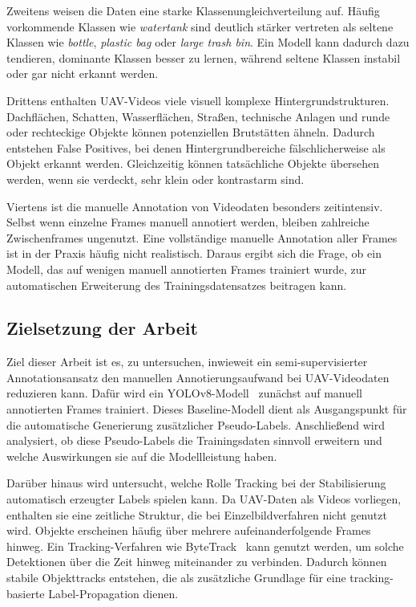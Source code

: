Zweitens weisen die Daten eine starke Klassenungleichverteilung auf. Häufig vorkommende Klassen wie \textit{watertank} sind deutlich stärker vertreten als seltene Klassen wie \textit{bottle}, \textit{plastic bag} oder \textit{large trash bin}. Ein Modell kann dadurch dazu tendieren, dominante Klassen besser zu lernen, während seltene Klassen instabil oder gar nicht erkannt werden.

Drittens enthalten UAV-Videos viele visuell komplexe Hintergrundstrukturen. Dachflächen, Schatten, Wasserflächen, Straßen, technische Anlagen und runde oder rechteckige Objekte können potenziellen Brutstätten ähneln. Dadurch entstehen False Positives, bei denen Hintergrundbereiche fälschlicherweise als Objekt erkannt werden. Gleichzeitig können tatsächliche Objekte übersehen werden, wenn sie verdeckt, sehr klein oder kontrastarm sind.

Viertens ist die manuelle Annotation von Videodaten besonders zeitintensiv. Selbst wenn einzelne Frames manuell annotiert werden, bleiben zahlreiche Zwischenframes ungenutzt. Eine vollständige manuelle Annotation aller Frames ist in der Praxis häufig nicht realistisch. Daraus ergibt sich die Frage, ob ein Modell, das auf wenigen manuell annotierten Frames trainiert wurde, zur automatischen Erweiterung des Trainingsdatensatzes beitragen kann.

\subsection{Zielsetzung der Arbeit}

Ziel dieser Arbeit ist es, zu untersuchen, inwieweit ein semi-supervisierter Annotationsansatz den manuellen Annotierungsaufwand bei UAV-Videodaten reduzieren kann. Dafür wird ein YOLOv8-Modell~\cite{Ultralytics2023} zunächst auf manuell annotierten Frames trainiert. Dieses Baseline-Modell dient als Ausgangspunkt für die automatische Generierung zusätzlicher Pseudo-Labels. Anschließend wird analysiert, ob diese Pseudo-Labels die Trainingsdaten sinnvoll erweitern und welche Auswirkungen sie auf die Modellleistung haben.

Darüber hinaus wird untersucht, welche Rolle Tracking bei der Stabilisierung automatisch erzeugter Labels spielen kann. Da UAV-Daten als Videos vorliegen, enthalten sie eine zeitliche Struktur, die bei Einzelbildverfahren nicht genutzt wird. Objekte erscheinen häufig über mehrere aufeinanderfolgende Frames hinweg. Ein Tracking-Verfahren wie ByteTrack~\cite{bytetrack} kann genutzt werden, um solche Detektionen über die Zeit hinweg miteinander zu verbinden. Dadurch können stabile Objekttracks entstehen, die als zusätzliche Grundlage für eine tracking-basierte Label-Propagation dienen.


